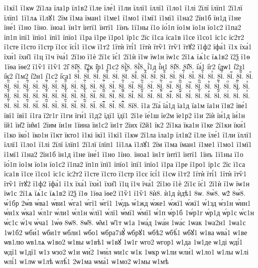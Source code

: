 {ї1кї1
ї1кѡ
2ї1ла
їла1р
їл1в2
ї1ле
їле́1
ї1ли
їллї1
їллї1
ї1ло1
ї1лі
2їлї
їлїп1
2ї1лї
їлїп1
1ї1лѧ
ї1лꙋ1
2їм
ї1ма
їман1
ї1ме1
ї1мо1
ї1мї1
ї1мї1
ї1на2
2їн1б
їн1д
ї1не
їне́1
ї1но
1їно.
їноа1
їн1т
їнтї1
їнтї1
1їнъ
1ї1ны
ї1о
їо́1п
їо1м
їо1н
їо1с2
ї1па2
їп1п
їпї1
їпїо1
їпї1
їпїо1
ї1ра
ї1ре
ї1ро1
їр1с
2їс
ї1са
їса1в
ї1се
ї1со1
їс1с
їс2т2
ї1сте
ї1сто
ї1стр
ї1сє
їсі́1
ї1сѡ
ї1т2
1їтѝ
їті́1
1їтѝ
їтѷ1
їтѷ1
їтꙋ2
ї1ф2
їфа́1
ї1х
їха́1
їхи́1
їхи̑1
ї1ц
ї1ч
їча́1
2ї1ю
ї1ѐ
2ї1є
їє́1
2ї1ѝ
ї1ѡ
їѡ1н
їѡ1с
2ї1ѧ
їѧ́1с
їѧ1в2
ї2ѯ
ї1ѳ
1їѳа
їѳе2
ї1ѷ1
ї1ѷ1
2і̑
8і̑8.
і̑2к
і̑р1
і̑1с2
8і҆̀8.
8і҆́8.
і҆́1д
і҆́н1
8і҆̈8.
8і҆̑8.
і҆а́1
і҆г2
і҆дѡ1
і҆2з1
і҆к2
і҆1м2
і҆2н1
і҆1с2
і҆са1
8іⷠ.
8іⷠ҇.
8іⷡ.
8іⷡ҇.
8іⷢ.
8іⷢ҇.
8іⷣ.
8іⷣ҇.
8іⷤ.
8іⷤ҇.
8іⷥ.
8іⷥ҇.
8іⷦ.
8іⷦ҇.
8іⷧ.
8іⷧ҇.
8іⷨ.
8іⷨ҇.
8іⷩ.
8іⷩ҇.
8іⷪ.
8іⷪ҇.
8іⷫ.
8іⷫ҇.
8іⷬ.
8іⷬ҇.
8іⷭ.
8іⷭ҇.
8іⷮ.
8іⷮ҇.
8іⷯ.
8іⷯ҇.
8іⷰ.
8іⷰ҇.
8іⷱ.
8іⷱ҇.
8іⷲ.
8іⷲ҇.
8іⷳ.
8іⷳ҇.
8іⷴ.
8іⷴ҇.
8іⷵ.
8іⷵ҇.
8іⷶ.
8іⷶ҇.
8іⷷ.
8іⷷ҇.
8іⷸ.
8іⷸ҇.
8іⷹ.
8іⷹ҇.
8іⷺ.
8іⷺ҇.
8іⷻ.
8іⷻ҇.
8іⷼ.
8іⷼ҇.
8іⷽ.
8іⷽ҇.
8іⷾ.
8іⷾ҇.
8іⷿ.
8іⷿ҇.
8іꙴ.
8іꙴ҇.
8іꙵ.
8іꙵ҇.
8іꙶ.
8іꙶ҇.
8іꙷ.
8іꙷ҇.
8іꙸ.
8іꙸ҇.
8іꙹ.
8іꙹ҇.
8іꙺ.
8іꙺ҇.
8іꙻ.
8іꙻ҇.
8і꙼.
8і꙼҇.
8і꙽.
8і꙽҇.
8ї8.
ї1а
2їа́
їа́1д
їа1д
їа1м
їа1н
ї1в2
їве́1
ївї1
ївї1
ї1га
ї2г1г
ї1ги
їги́1
ї1д2
їдї1
їдї1
2ї1е
їе́1ш
їе2м
їе1р2
ї1и
2їѝ
їи́1д
їи́1н
їй1
їи̑2
їи̑м1
2їим
їи1н
1їина
їи1с2
їи1т
2їих
ї2й1
їк2
2ї1ка
їка1н
ї1ке
2ї1ки
їки́1
ї1ко
їко́1
їко1н
ї1кт
їкто1
ї1кі
їкї1
ї1кї1
ї1кѡ
2ї1ла
їла1р
їл1в2
ї1ле
їле́1
ї1ли
їллї1
їллї1
ї1ло1
ї1лі
2їлї
їлїп1
2ї1лї
їлїп1
1ї1лѧ
ї1лꙋ1
2їм
ї1ма
їман1
ї1ме1
ї1мо1
ї1мї1
ї1мї1
ї1на2
2їн1б
їн1д
ї1не
їне́1
ї1но
1їно.
їноа1
їн1т
їнтї1
їнтї1
1їнъ
1ї1ны
ї1о
їо́1п
їо1м
їо1н
їо1с2
ї1па2
їп1п
їпї1
їпїо1
їпї1
їпїо1
ї1ра
ї1ре
ї1ро1
їр1с
2їс
ї1са
їса1в
ї1се
ї1со1
їс1с
їс2т2
ї1сте
ї1сто
ї1стр
ї1сє
їсі́1
ї1сѡ
ї1т2
1їтѝ
їті́1
1їтѝ
їтѷ1
їтѷ1
їтꙋ2
ї1ф2
їфа́1
ї1х
їха́1
їхи́1
їхи̑1
ї1ц
ї1ч
їча́1
2ї1ю
ї1ѐ
2ї1є
їє́1
2ї1ѝ
ї1ѡ
їѡ1н
їѡ1с
2ї1ѧ
їѧ́1с
їѧ1в2
ї2ѯ
ї1ѳ
1їѳа
їѳе2
ї1ѷ1
ї1ѷ1
8ѝ8.
ѝ1д
ѝдѣ1
8ѡ.
8ѡ̀8.
ѡ2́
8ѡ́8.
ѡ́1бр
2ѡ́в
ѡ́ва1
ѡ́ви1
ѡ́га1
ѡ́гї1
ѡ́гї1
1ѡ́дь
ѡ́1жд
ѡ́же1
ѡ́жї1
ѡ́жї1
ѡ́1зд
ѡ́з1н
ѡ́ин1
ѡ́и1х
ѡ́ка1
ѡ́л1г
ѡ́ли1
ѡ́л1н
ѡ́лї1
ѡ́лї1
ѡ́мї1
ѡ́мї1
ѡ́1п
ѡ́р1б
1ѡ́р1г
ѡ́р1д
ѡ́р1с
ѡ́с1н
ѡ́с1с
ѡ́1ч
ѡ́ча1
1ѡ́ѳ
8ѡ̈8.
8ѡ̑8.
ѡ̑м1
ѡ̑1т
ѡ1а
1ѡа́д
1ѡа́н
1ѡа́с
1ѡак
1ѡа2н1
1ѡа1с
1ѡ1б2
ѡби́1
ѡби1т
ѡбли1
ѡбо1
ѡбра7зꙋ́
ѡбрꙋ1
ѡбѣ2
ѡбѣ́1
ѡбꙋ1
ѡ1ва
ѡва́1
ѡ1ве
ѡв1лю
ѡв1лѧ
ѡ1во2
ѡ1вы
ѡ1вѣ1
ѡ1вꙋ
1ѡ1г
ѡго2
ѡгор1
ѡ1да
1ѡ1де
ѡ1ді
ѡді́1
ѡдї1
ѡ1дї1
ѡ1з
ѡзо2
ѡ1и
ѡи́2
1ѡи́л
ѡи1с
ѡ1к
1ѡкр
ѡ1ли
ѡли́1
ѡ1ло1
ѡ1лы
ѡ1лі
ѡлі́1
ѡ1лѡ
ѡ1лѣ
ѡлѣ́1
2ѡ1ма
ѡма́1
ѡ1мо2
ѡ1мы
ѡ1мѣ
}

